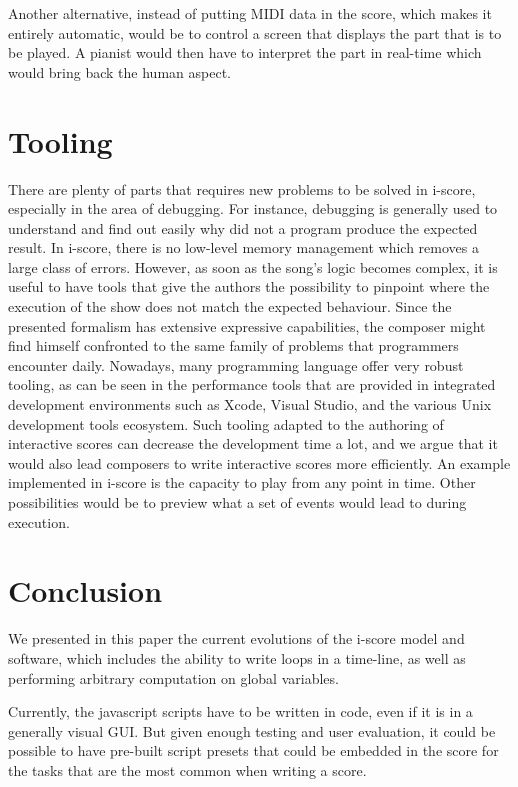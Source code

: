 \documentclass{article}
\begin{document}
Another alternative, instead of putting MIDI data in the score,
which makes it entirely automatic,  
would be to control a screen that displays the part that is 
to be played.
A pianist would then have to interpret the part 
in real-time which would bring back the human aspect.

\section{Tooling}
There are plenty of parts that requires new problems to be solved in i-score, especially in the area of debugging. 
For instance, debugging is generally used to understand and find out easily why did not a program produce the expected result.
In i-score, there is no low-level memory management which removes a large class of errors.
However, as soon as the song's logic becomes complex, it is useful to have tools that give the authors the possibility to pinpoint where the execution of the show does not match the expected behaviour.
Since the presented formalism has extensive expressive capabilities, the composer might find himself confronted to the same family of problems that programmers encounter daily.
Nowadays, many programming language offer very robust tooling, as can be seen in the performance tools that are provided in integrated development environments such as Xcode, Visual Studio, and the various Unix development tools ecosystem\cite{spinellis2014software}.
Such tooling adapted to the authoring of interactive scores can decrease the development time a lot, and we argue that it would also lead composers to write interactive scores more efficiently.
An example implemented in i-score is the capacity to play from any point in time. 
Other possibilities would be to preview what a set of events would lead to during execution. 
\section{Conclusion}
We presented in this paper the current evolutions of the i-score 
model and software, which includes the ability to write loops in a time-line, 
as well as performing arbitrary computation on global variables.

Currently, the javascript scripts have to be written in code, even if it 
is in a generally visual GUI. 
But given enough testing and user evaluation, it could be possible to have pre-built script presets 
that could be embedded in the score for the tasks that are the most common when writing a score.
\end{document}
